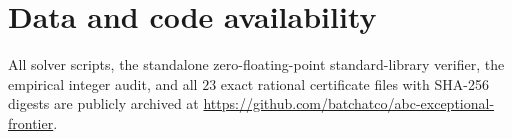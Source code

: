 \documentclass[11pt,a4paper]{amsart}
\theoremstyle{plain}
\theoremstyle{definition}
\theoremstyle{remark}
\begin{document}
\section*{Data and code availability}
All solver scripts, the standalone zero-floating-point standard-library verifier, the empirical integer audit, and all $23$ exact rational certificate files with SHA-256 digests are publicly archived at \url{https://github.com/batchatco/abc-exceptional-frontier}.



\end{document}

